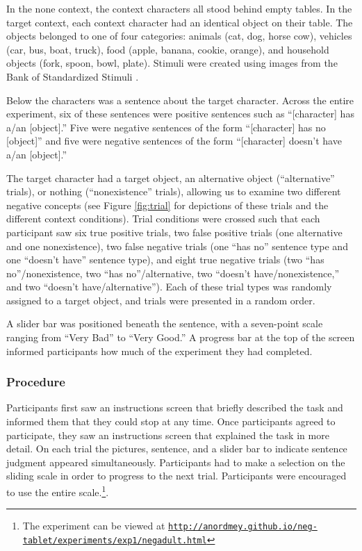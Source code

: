 \documentclass[man, noapacite]{apa2}
\begin{document}
In the none context, the context characters all stood behind empty tables. In the target context, each context character had an identical object on their table. The objects belonged to one of four categories: animals (cat, dog, horse cow), vehicles (car, bus, boat, truck), food (apple, banana, cookie, orange), and household objects (fork, spoon, bowl, plate). Stimuli were created using images from the Bank of Standardized Stimuli \cite{brodeur2010}.

Below the characters was a sentence about the target character. Across the entire experiment, six of these sentences were positive sentences such as ``[character] has a/an [object].'' Five were negative sentences of the form ``[character] has no [object]'' and five were negative sentences of the form ``[character] doesn't have a/an [object].''

The target character had a target object, an alternative object (``alternative'' trials), or nothing (``nonexistence'' trials), allowing us to examine two different negative concepts (see Figure \ref{fig:trial} for depictions of these trials and the different context conditions).  Trial conditions were crossed such that each participant saw six true positive trials, two false positive trials (one alternative and one nonexistence), two false negative trials (one ``has no'' sentence type and one ``doesn't have'' sentence type), and eight true negative trials (two ``has no''/nonexistence, two ``has no''/alternative, two ``doesn't have/nonexistence,'' and two ``doesn't have/alternative''). Each of these trial types was randomly assigned to a target object, and trials were presented in a random order.

A slider bar was positioned beneath the sentence, with a seven-point scale ranging from ``Very Bad'' to ``Very Good.'' A progress bar at the top of the screen informed participants how much of the experiment they had completed.

\subsubsection{Procedure}

Participants first saw an instructions screen that briefly described the task and informed them that they could stop at any time. Once participants agreed to participate, they saw an instructions screen that explained the task in more detail. On each trial the pictures, sentence, and a slider bar to indicate sentence judgment appeared simultaneously. Participants had to make a selection on the sliding scale in order to progress to the next trial. Participants were encouraged to use the entire scale.\footnote{The experiment can be viewed at \href{http://anordmey.github.io/neg-tablet/experiments/exp1/negadult.html}{\nolinkurl{http://anordmey.github.io/neg-tablet/experiments/exp1/negadult.html}}}.
\end{document}
